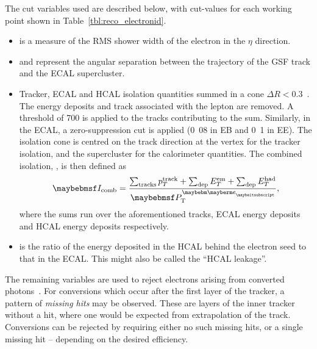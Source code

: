 The cut variables used are described below, with cut-values for each working
point shown in Table~\ref{tbl:reco_electronid}.
\begin{itemize}
\item \sigmaieta is a measure of the \ac{RMS} shower width of the electron
  in the $\eta$ direction.
\item \deltaphiin and \deltaetain represent the angular separation between the
  trajectory of the \ac{GSF} track and the \ac{ECAL} supercluster.
\item Tracker, \ac{ECAL} and \ac{HCAL} isolation quantities summed in a cone
  $\Delta R < 0.3$~\cite{lepton_isolation_an}. The energy deposits and track
  associated with the lepton are removed. A threshold of \unit{700}{\MeV} is
  applied to the tracks contributing to the sum. Similarly, in the \ac{ECAL}, a
  zero-suppression cut is applied (\unit{0.08}{\GeV} in \ac{EB} and
  \unit{0.1}{\GeV} in \ac{EE}). The isolation cone is centred on the track
  direction at the vertex for the tracker isolation, and the supercluster for
  the calorimeter quantities. The combined isolation, \CombIso, is then defined
  as
  \begin{equation*}
    \CombIso = \frac{\sum_{\textrm{tracks}} p_T^{\textrm{track}} + \sum_{\textrm{dep}}
    E_T^{\textrm{em}} + \sum_{\textrm{dep}} E_T^{\textrm{had}}}{\Pte},
   \end{equation*}
   where the sums run over the aforementioned tracks, \ac{ECAL} energy deposits
   and \ac{HCAL} energy deposits respectively.
 \item \HoverE is the ratio of the energy deposited in the \ac{HCAL} behind the
   electron seed to that in the \ac{ECAL}. This might also be called the
   ``\ac{HCAL} leakage''.
\end{itemize}

The remaining variables are used to reject electrons arising from converted
photons~\cite{cms_an_2009_159}. For conversions which occur after the first
layer of the tracker, a pattern of \emph{missing hits} may be observed. These
are layers of the inner tracker without a hit, where one would be expected from
extrapolation of the track. Conversions can be rejected by requiring either no
such missing hits, or a single missing hit -- depending on the desired
efficiency.

